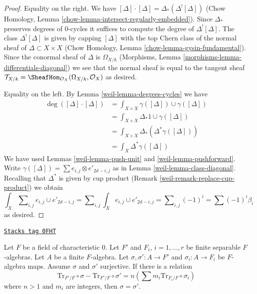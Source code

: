\begin{proof}

Equality on the right. We have
$[\Delta] \cdot [\Delta] = \Delta_*(\Delta^![\Delta])$
(Chow Homology, Lemma \ref{chow-lemma-intersect-regularly-embedded}).
Since $\Delta_*$ preserves degrees of $0$-cycles it suffices to compute
the degree of $\Delta^![\Delta]$. The class $\Delta^![\Delta]$ is given
by capping $[\Delta]$ with
the top Chern class of the normal sheaf of $\Delta \subset X \times X$
(Chow Homology, Lemma \ref{chow-lemma-gysin-fundamental}).
Since the conormal sheaf of $\Delta$ is $\Omega_{X/k}$
(Morphisms, Lemma \ref{morphisms-lemma-differentials-diagonal})
we see that the normal sheaf is equal to the tangent sheaf
$\mathcal{T}_{X/k} = \SheafHom_{\mathcal{O}_X}(\Omega_{X/k}, \mathcal{O}_X)$
as desired.

\medskip\noindent
Equality on the left. By Lemma \ref{weil-lemma-degrees-cycles} we have
\begin{align*}
\deg([\Delta] \cdot [\Delta])
& =
\int_{X \times X} \gamma([\Delta]) \cup \gamma([\Delta]) \\
& =
\int_{X \times X} \Delta_*1 \cup \gamma([\Delta]) \\
& =
\int_{X \times X} \Delta_*(\Delta^*\gamma([\Delta])) \\
& =
\int_X \Delta^*\gamma([\Delta])
\end{align*}
We have used Lemmas \ref{weil-lemma-push-unit} and
\ref{weil-lemma-pushforward}.
Write $\gamma([\Delta]) = \sum  e_{i, j} \otimes e'_{2d - i , j}$
as in Lemma \ref{weil-lemma-class-diagonal}.
Recalling that $\Delta^*$ is given by cup product
(Remark \ref{weil-remark-replace-cup-product}) we obtain
$$
\int_X \sum\nolimits_{i, j} e_{i, j} \cup e'_{2d - i, j} =
\sum\nolimits_{i, j} \int_X e_{i, j} \cup e'_{2d - i, j} =
\sum\nolimits_{i, j} (-1)^i = \sum (-1)^i\beta_i
$$
as desired.
\end{proof}

\begin{lemma}
\label{weil-lemma-algebra-relations}
\href{https://stacks.math.columbia.edu/tag/0FHT}{\texttt{Stacks tag 0FHT}}

Let $F$ be a field of characteristic $0$.
Let $F'$ and $F_i$, $i = 1, \ldots, r$
be finite separable $F$-algebras. Let $A$ be a finite $F$-algebra.
Let $\sigma, \sigma' : A \to F'$ and $\sigma_i : A \to F_i$
be $F$-algebra maps. Assume $\sigma$ and $\sigma'$ surjective.
If there is a relation
$$
\text{Tr}_{F'/F} \circ \sigma - \text{Tr}_{F'/F} \circ \sigma' =
n(\sum m_i \text{Tr}_{F_i/F} \circ \sigma_i)
$$
where $n > 1$ and $m_i$ are integers, then $\sigma = \sigma'$.
\end{lemma}

